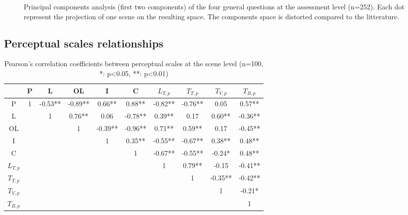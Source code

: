 \documentclass[11pt,a4paper]{article}
\begin{document}
\begin{figure}[h]
\begin{subfigure}[t]{0.5\textwidth}
    \end{subfigure}
    \caption{Principal components analysis (first two components) of the four general questions at the assessment level (n=252). Each dot represent the projection of one scene on the resulting space. The components space is distorted compared to the litterature.}\label{fig:pspace}
\end{figure}



\subsection{Perceptual scales relationships}
\label{sec:percm}

\begin{table}
\centering
\caption{Pearson's correlation coefficients between perceptual scales at the scene level (n=100, *: p<0.05, **: p<0.01)}
\label{tab:percc}
\begin{tabular}{ c | c c c c c c c c c }
\hline
	 & P & L & OL & I & C & $L_{T, p}$ & $T_{T, p}$ & $T_{V, p}$ & $T_{B, p}$ \\ \hline
	P & 1 & -0.53** & -0.89** & 0.66** & 0.88** & -0.82** & -0.76** & 0.05 & 0.57** \\
	L &  & 1 & 0.76** & 0.06 & -0.78** & 0.39** & 0.17 & 0.60** & -0.36** \\
	OL &  &  & 1 & -0.39** & -0.96** & 0.71** & 0.59** & 0.17 & -0.45** \\
	I &  &  &  & 1 & 0.35** & -0.55** & -0.67** & 0.38** & 0.48** \\
	C &  &  &  &  & 1 & -0.67** & -0.55** & -0.24* & 0.48** \\
	$L_{T, p}$ &  &  &  &  &  & 1 & 0.79** & -0.15 & -0.41** \\
	$T_{T, p}$ &  &  &  &  &  &  & 1 & -0.35** & -0.42** \\
	$T_{V, p}$ &  &  &  &  &  &  &  & 1 & -0.21* \\
	$T_{B, p}$ &  &  &  &  &  &  &  &  & 1 \\ \hline
\end{tabular}
\end{table}
\end{document}

